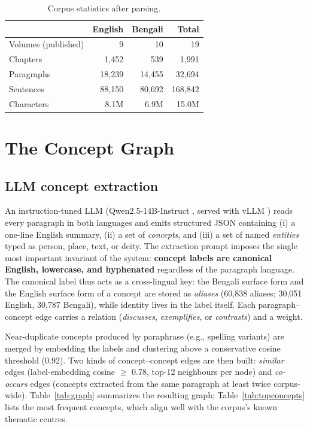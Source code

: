 \documentclass[pdflatex,sn-mathphys-num]{sn-jnl}
\begin{document}
\begin{table}[t]
\centering
\caption{Corpus statistics after parsing.}
\label{tab:corpus}
\begin{tabular}{lrrr}
\toprule
 & English & Bengali & Total\\
\midrule
Volumes (published)  & 9      & 10     & 19\\
Chapters    & 1{,}452 & 539   & 1{,}991\\
Paragraphs  & 18{,}239 & 14{,}455 & 32{,}694\\
Sentences   & 88{,}150 & 80{,}692 & 168{,}842\\
Characters  & 8.1M   & 6.9M   & 15.0M\\
\bottomrule
\end{tabular}
\end{table}

\section{The Concept Graph}
\label{sec:graph}

\subsection{LLM concept extraction}

An instruction-tuned LLM (Qwen2.5-14B-Instruct \cite{qwen25}, served with
vLLM \cite{kwon2023vllm}) reads every paragraph in both languages and
emits structured JSON containing (i) a one-line English summary, (ii) a
set of \emph{concepts}, and (iii) a set of named \emph{entities} typed as
person, place, text, or deity. The extraction prompt imposes the single
most important invariant of the system: \textbf{concept labels are
canonical English, lowercase, and hyphenated} regardless of the paragraph
language. The canonical label thus acts as a cross-lingual key: the
Bengali surface form and the English surface form of a concept are stored
as \emph{aliases} (60{,}838 aliases; 30{,}051 English, 30{,}787 Bengali),
while identity lives in the label itself. Each paragraph--concept edge
carries a relation (\emph{discusses}, \emph{exemplifies}, or
\emph{contrasts}) and a weight.

Near-duplicate concepts produced by paraphrase (e.g., spelling variants)
are merged by embedding the labels and clustering above a conservative
cosine threshold (0.92). Two kinds of concept--concept edges are then
built: \emph{similar} edges (label-embedding cosine $\geq$ 0.78, top-12
neighbours per node) and \emph{co-occurs} edges (concepts extracted from
the same paragraph at least twice corpus-wide).
Table~\ref{tab:graph} summarizes the resulting graph;
Table~\ref{tab:topconcepts} lists the most frequent concepts, which
align well with the corpus's known thematic centres.
\end{document}
